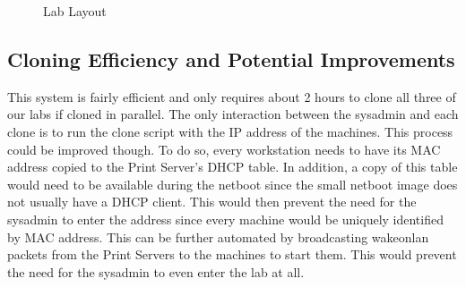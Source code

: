 \begin{figure}
  \begin{center}
  \end{center}
  \caption{Lab Layout}
  \label{fig:RoomNetworkLayout}
\end{figure}


\subsection{Cloning Efficiency and Potential Improvements}
This system is fairly efficient and only requires about 2 hours to clone all three of our labs if cloned in parallel.  The only interaction between the sysadmin and each clone is to run the clone script with the IP address of the machines.  This process could be improved though.  To do so, every workstation needs to have its MAC address copied to the Print Server's DHCP table.  In addition, a copy of this table would need to be available during the netboot since the small netboot image does not usually have a DHCP client.  This would then prevent the need for the sysadmin to enter the address since every machine would be uniquely identified by MAC address.  This can be further automated by broadcasting wakeonlan packets from the Print Servers to the machines to start them.  This would prevent the need for the sysadmin to even enter the lab at all.  

